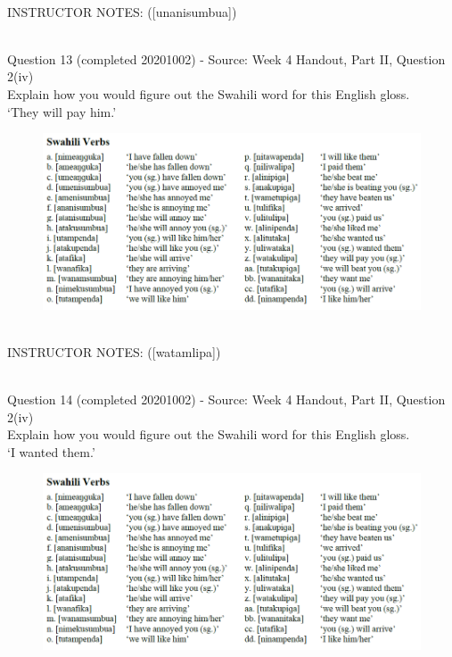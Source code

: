 \documentclass[12pt]{article}
\begin{document}
~\\
INSTRUCTOR NOTES: ([unanisumbua])


~\\

{\large Question 13} (completed 20201002) - Source: Week 4 Handout, Part II, Question 2(iv)\\

Explain how you would figure out the Swahili word for this English gloss.\\

‘They will pay him.’

\begin{figure}[H]
\includegraphics{../images/swahiliverbs.png}
\end{figure}

~\\
INSTRUCTOR NOTES: ([watamlipa])


~\\

{\large Question 14} (completed 20201002) - Source: Week 4 Handout, Part II, Question 2(iv)\\

Explain how you would figure out the Swahili word for this English gloss.\\

‘I wanted them.’

\begin{figure}[H]
\includegraphics{../images/swahiliverbs.png}
\end{figure}
\end{document}
